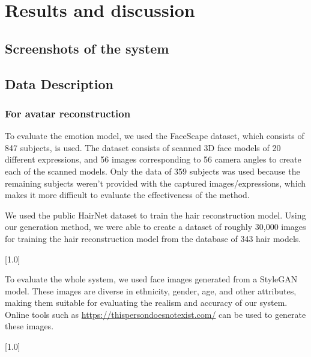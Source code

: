 \section{Results and discussion}\label{sec:results}

\subsection{Screenshots of the system}

\subsection{Data Description}
\subsubsection{For avatar reconstruction}
To evaluate the emotion model, we used the FaceScape dataset, which consists of 847 subjects, is used. The dataset consists of scanned 3D face models of 20 different expressions, and 56 images corresponding to 56 camera angles to create each of the scanned models. Only the data of 359 subjects was used because the remaining subjects weren't provided with the captured images/expressions, which makes it more difficult to evaluate the effectiveness of the method.


We used the public HairNet dataset \cite{zhouHairNetSingleViewHair2018} to train the hair reconstruction model. Using our generation method, we were able to create a dataset of roughly 30,000 images for training the hair reconstruction model from the database of 343 hair models.

[1.0]

To evaluate the whole system, we used face images generated from a StyleGAN \cite{karrasStyleBasedGeneratorArchitecture2019} model. These images are diverse in ethnicity, gender, age, and other attributes, making them suitable for evaluating the realism and accuracy of our system. Online tools such as \url{https://thispersondoesnotexist.com/} can be used to generate these images.

[1.0]

